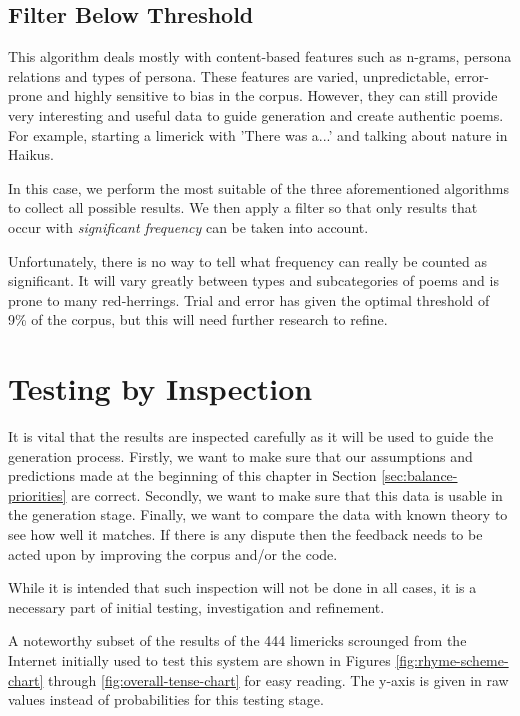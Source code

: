 \subsection{Filter Below Threshold}

This algorithm deals mostly with content-based features such as n-grams, persona relations and types of persona. These features are varied, unpredictable, error-prone and highly sensitive to bias in the corpus. However, they can still provide very interesting and useful data to guide generation and create authentic poems. For example, starting a limerick with 'There was a...' and talking about nature in Haikus.

In this case, we perform the most suitable of the three aforementioned algorithms to collect all possible results. We then apply a filter so that only results that occur with \textit{significant frequency} can be taken into account.

Unfortunately, there is no way to tell what frequency can really be counted as significant. It will vary greatly between types and subcategories of poems and is prone to many red-herrings. Trial and error has given the optimal threshold of 9\% of the corpus, but this will need further research to refine.

\section{Testing by Inspection}

It is vital that the results are inspected carefully as it will be used to guide the generation process. Firstly, we want to make sure that our assumptions and predictions made at the beginning of this chapter in Section \ref{sec:balance-priorities} are correct. Secondly, we want to make sure that this data is usable in the generation stage. Finally, we want to compare the data with known theory to see how well it matches. If there is any dispute then the feedback needs to be acted upon by improving the corpus and/or the code.

While it is intended that such inspection will not be done in all cases, it is a necessary part of initial testing, investigation and refinement. 

A noteworthy subset of the results of the 444 limericks scrounged from the Internet initially used to test this system are shown in Figures \ref{fig:rhyme-scheme-chart} through \ref{fig:overall-tense-chart} for easy reading. The y-axis is given in raw values instead of probabilities for this testing stage.
\newcommand{\exedout}{%
  \rule{0.8\textwidth}{0.5\textwidth}%
}

